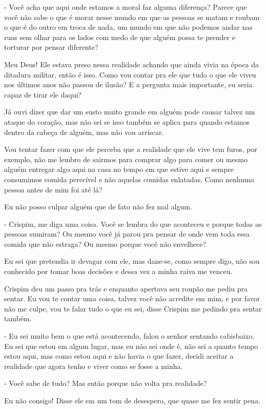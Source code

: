 - Você acha que aqui onde estamos a moral faz alguma diferença? Parece que você não sabe o que é morar nesse mundo em que as pessoas se matam e roubam o que é do outro em troca de nada, um mundo em que não podemos andar nas ruas sem olhar para os lados com medo de que alguém possa te prender e torturar por pensar diferente?

Meu Deus! Ele estava preso nessa realidade achando que ainda vivia na época da ditadura militar, então é isso. Como vou contar pra ele que tudo o que ele viveu nos últimos anos não passou de ilusão? E a pergunta mais importante, eu seria capaz de tirar ele daqui?

Já ouvi dizer que dar um susto muito grande em alguém pode causar talvez um ataque do coração, mas não sei se isso também se aplica para quando estamos dentro da cabeça de alguém, mas não vou arriscar.

Vou tentar fazer com que ele perceba que a realidade que ele vive tem furos, por exemplo, não me lembro de sairmos para comprar algo para comer ou mesmo alguém entregar algo aqui na casa no tempo em que estive aqui e sempre consumimos comida perecível e não aquelas comidas enlatadas. Como nenhuma pessoa antes de mim foi até lá?

Eu não posso culpar alguém que de fato não fez mal algum.

- Crispim, me diga uma coisa. Você se lembra do que aconteceu e porque todas as pessoas sumiram? Ou mesmo você já parou pra pensar de onde vem toda essa comida que não estraga? Ou mesmo porque você não envelhece?

Eu sei que pretendia ir devagar com ele, mas dane-se, como sempre digo, não sou conhecido por tomar boas decisões e dessa vez a minha raiva me venceu.

Crispim deu um passo pra trás e enquanto apertava seu roupão me pediu pra sentar. Eu vou te contar uma coisa, talvez você não acredite em mim, e por favor não me culpe, vou te falar tudo o que eu sei, disse Crispim me pedindo pra sentar também.

- Eu sei muito bem o que está acontecendo, falou o senhor sentando cabisbaixo. Eu sei que estou em algum lugar, mas eu não sei onde é, não sei a quanto tempo estou aqui, mas como estou aqui e não havia o que fazer, decidi aceitar a realidade que agora tenho e viver como se fosse a minha.

- Você sabe de tudo? Mas então porque não volta pra realidade?

Eu não consigo! Disse ele em um tom de desespero, que quase me fez sentir pena.

